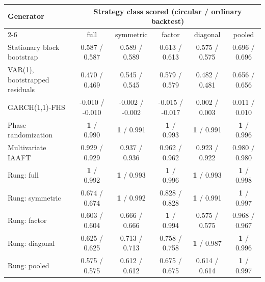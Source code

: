 \begin{tabular}{lccccc}
\toprule
Generator & \multicolumn{5}{c}{Strategy class scored (circular / ordinary backtest)} \\
\cmidrule(lr){2-6}
 & full & symmetric & factor & diagonal & pooled \\
\midrule
Stationary block bootstrap & 0.587 / 0.587 & 0.589 / 0.589 & 0.613 / 0.613 & 0.575 / 0.575 & 0.696 / 0.696 \\
VAR(1), bootstrapped residuals & 0.470 / 0.469 & 0.545 / 0.545 & 0.579 / 0.579 & 0.482 / 0.481 & 0.656 / 0.656 \\
GARCH(1,1)-FHS & -0.010 / -0.010 & -0.002 / -0.002 & -0.015 / -0.017 & 0.002 / 0.003 & 0.011 / 0.010 \\
Phase randomization & \textbf{1} / 0.990 & \textbf{1} / 0.991 & \textbf{1} / 0.993 & \textbf{1} / 0.991 & \textbf{1} / 0.996 \\
Multivariate IAAFT & 0.929 / 0.929 & 0.937 / 0.936 & 0.962 / 0.962 & 0.923 / 0.922 & 0.980 / 0.980 \\
\midrule
Rung: full & \textbf{1} / 0.992 & \textbf{1} / 0.993 & \textbf{1} / 0.996 & \textbf{1} / 0.993 & \textbf{1} / 0.998 \\
Rung: symmetric & 0.674 / 0.674 & \textbf{1} / 0.992 & 0.828 / 0.828 & \textbf{1} / 0.991 & \textbf{1} / 0.997 \\
Rung: factor & 0.603 / 0.604 & 0.666 / 0.666 & \textbf{1} / 0.994 & 0.575 / 0.575 & 0.968 / 0.967 \\
Rung: diagonal & 0.625 / 0.625 & 0.713 / 0.713 & 0.758 / 0.758 & \textbf{1} / 0.987 & \textbf{1} / 0.996 \\
Rung: pooled & 0.575 / 0.575 & 0.612 / 0.612 & 0.675 / 0.675 & 0.614 / 0.614 & \textbf{1} / 0.997 \\
\bottomrule
\end{tabular}